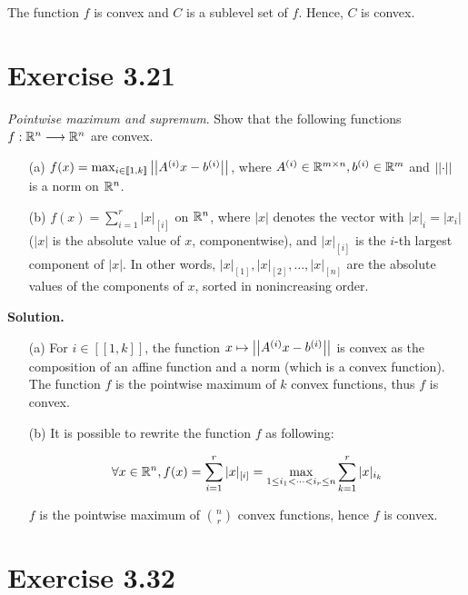 \documentclass[a4paper, 11pt]{report}
\begin{document}
\begin{itemize}
    The function $f$ is convex and $C$ is a sublevel set of $f$. Hence, $C$ is convex.
\end{itemize}



\section*{Exercise 3.21}

\textit{Pointwise maximum and supremum}. Show that the following functions $f: \mathbb{R}^{n} \longrightarrow \mathbb{R}^{n}$ are convex.

\begin{itemize}
    \item[(a)] $f(x) = \max_{i \in [\![ 1, k ]\!]} \left|\left| A^{(i)}x - b^{(i)} \right|\right|_{}$, where $A^{(i)} \in \mathbb{R}^{m \times n}, b^{(i)} \in \mathbb{R}^{m}$ and $\left|\left| \cdot \right|\right|_{}$ is a norm on $\mathbb{R}^{n}$.
    
    \item[(b)] $f(x) = \sum_{i=1}^{r} |x|_{[i]}$ on $\mathbb{R}^{n}$, where $|x|$ denotes the vector with $|x|_{i} = |x_{i}|$ (\ie $|x|$ is the absolute value of $x$, componentwise), and $|x|_{[i]}$ is the $i$-th largest component of $|x|$. In other words, $|x|_{[1]}, |x|_{[2]}, \dots, |x|_{[n]}$ are the absolute values of the components of $x$, sorted in nonincreasing order.
\end{itemize}

\noindent \textbf{Solution.}

\begin{itemize}
    \item[(a)] For $i \in [\![ 1, k ]\!]$, the function $x \mapsto \left|\left| A^{(i)}x - b^{(i)} \right|\right|_{}$ is convex as the composition of an affine function and a norm (which is a convex function). The function $f$ is the pointwise maximum of $k$ convex functions, thus $f$ is convex.
    
    \item[(b)] It is possible to rewrite the function $f$ as following:
    
    \[ \forall x \in \mathbb{R}^{n}, f(x) = \sum_{i=1}^{r} |x|_{[i]} = \max_{1 \leq i_{1} < \dots < i_{r} \leq n} \sum_{k=1}^{r} |x|_{i_{k}} \]
    
    $f$ is the pointwise maximum of $\binom{n}{r}$ convex functions, hence $f$ is convex.
\end{itemize}



\section*{Exercise 3.32}
\end{document}
